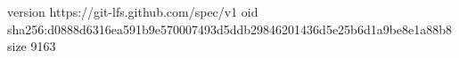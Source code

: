 version https://git-lfs.github.com/spec/v1
oid sha256:d0888d6316ea591b9e570007493d5ddb29846201436d5e25b6d1a9be8e1a88b8
size 9163
